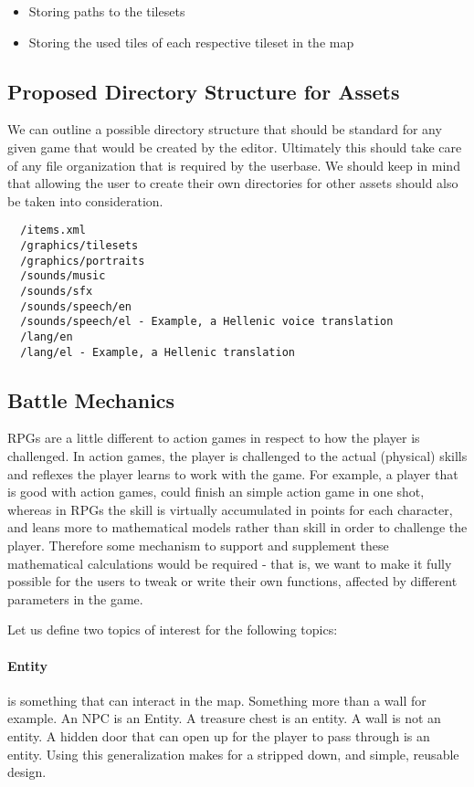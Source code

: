 \begin{itemize} 
\item Storing paths to the tilesets
\item Storing the used tiles of each respective tileset in the map
\end{itemize} 

\subsection{Proposed Directory Structure for Assets}

We can outline a possible directory structure that should be standard for any
given game that would be created by the editor. Ultimately this should take
care of any file organization that is required by the userbase. We should keep
in mind that allowing the user to create their own directories for other assets
should also be taken into consideration.

\begin{lstlisting}
  /items.xml
  /graphics/tilesets
  /graphics/portraits
  /sounds/music
  /sounds/sfx
  /sounds/speech/en
  /sounds/speech/el - Example, a Hellenic voice translation
  /lang/en
  /lang/el - Example, a Hellenic translation
\end{lstlisting}

\subsection{Battle Mechanics}

RPGs are a little different to action games in respect to how the player is
challenged. In action games, the player is challenged to the actual (physical)
skills and reflexes the player learns to work with the game. For example, a
player that is good with action games, could finish an simple action game in
one shot, whereas in RPGs the skill is virtually accumulated in points for each
character, and leans more to mathematical models rather than skill in order to
challenge the player. Therefore some mechanism to support and supplement these
mathematical calculations would be required - that is, we want to make it fully
possible for the users to tweak or write their own functions, affected by 
different parameters in the game. 

Let us define two topics of interest for the following topics: 

\paragraph{Entity} is something that can interact in the map. Something more
than a wall for example. An NPC is an Entity. A treasure chest is an entity. A
wall is not an entity. A hidden door that can open up for the player to pass
through is an entity. Using this generalization makes for a stripped down,
and simple, reusable design. 

